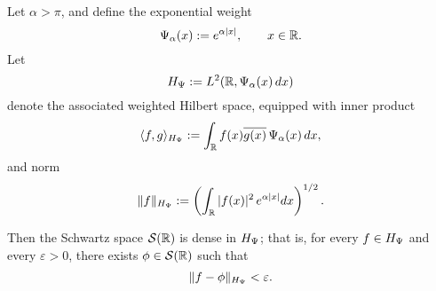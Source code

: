 \begin{lemma}
\label{lem:density_schwartz_weighted_L2}
Let \( \alpha > \pi \), and define the exponential weight
\[
\Psi_\alpha(x) := e^{\alpha |x|}, \qquad x \in \mathbb{R}.
\]
Let
\[
H_{\Psi} := L^2(\mathbb{R}, \Psi_\alpha(x)\, dx)
\]
denote the associated weighted Hilbert space, equipped with inner product
\[
\langle f, g \rangle_{H_{\Psi}} := \int_{\mathbb{R}} f(x) \overline{g(x)}\, \Psi_\alpha(x)\, dx,
\]
and norm
\[
\|f\|_{H_{\Psi}} := \left( \int_{\mathbb{R}} |f(x)|^2\, e^{\alpha |x|} dx \right)^{1/2}.
\]

Then the Schwartz space \( \mathcal{S}(\mathbb{R}) \) is dense in \( H_{\Psi} \); that is, for every \( f \in H_{\Psi} \) and every \( \varepsilon > 0 \), there exists \( \phi \in \mathcal{S}(\mathbb{R}) \) such that
\[
\| f - \phi \|_{H_{\Psi}} < \varepsilon.
\]
\end{lemma}
